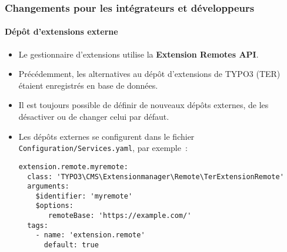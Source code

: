 %

\begin{frame}[fragile]
	\frametitle{Changements pour les intégrateurs et développeurs}
	\framesubtitle{Dépôt d'extensions externe}


	\begin{itemize}
		\item Le gestionnaire d'extensions utilise la \textbf{Extension Remotes API}.
		\item Précédemment, les alternatives au dépôt d'extensions de TYPO3 (TER)
			étaient enregistrés en base de données.
		\item Il est toujours possible de définir de nouveaux dépôts externes,
			de les désactiver ou de changer celui par défaut.
		\item Les dépôts externes se configurent dans le fichier
			\small\texttt{Configuration/Services.yaml}, par exemple~:
\begin{lstlisting}
extension.remote.myremote:
  class: 'TYPO3\CMS\Extensionmanager\Remote\TerExtensionRemote'
  arguments:
    $identifier: 'myremote'
    $options:
       remoteBase: 'https://example.com/'
  tags:
    - name: 'extension.remote'
      default: true
\end{lstlisting}

	\end{itemize}

\end{frame}

